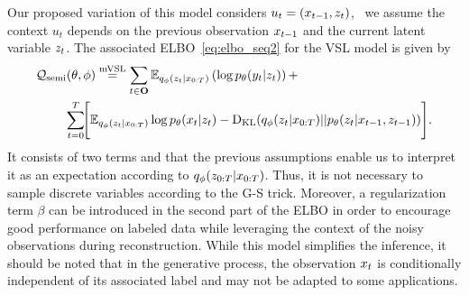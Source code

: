 Our proposed variation of this model considers
$u_t = (x_{t-1}, z_t)$, \ie~we assume the context $u_t$ depends on the previous observation $x_{t-1}$ 
and the current latent variable $z_t$.
The associated ELBO~\eqref{eq:elbo_seq2} 
for the VSL model is given by
\begin{align*}
\mathcal{Q}_{\mathrm{semi}} & (\theta,\phi) \overset{\rm mVSL}{=}
    \sum_{t \in \mathbf{O}} {\mathbb{E}}_{q_\phi(z_{t}| x_{0:T})} \left(
     \log p_{\theta}(y_{t}|z_{t}) \right) +\\
    & \! \sum_{t=0}^T\!\!
    \Bigg[ {\mathbb{E}}_{q_\phi(z_{t}| x_{0:T})} \log p_{\theta}(x_t|z_t) 
    -    \mathrm{D}_{\mathrm{KL}}(q_\phi(z_t|x_{0:T})|| p_{\theta}(z_t|x_{t-1}, z_{t-1} ))  \Bigg] 
    \text{.}
\end{align*}
It consists of two terms and 
that the previous assumptions enable us to interpret it as an expectation 
according to $q_\phi(z_{0:T}|x_{0:T})$. 
Thus, it is not necessary to sample discrete variables according to 
the G-S trick. Moreover, a regularization term $\beta$ can be introduced 
in the second part of the ELBO in 
order to encourage good performance on labeled data 
while leveraging the context of the noisy observations during reconstruction.
While this model simplifies the inference, 
it should be noted that in the generative process, 
the observation $x_t$ is conditionally independent of its associated label and may not
be adapted to some applications.

